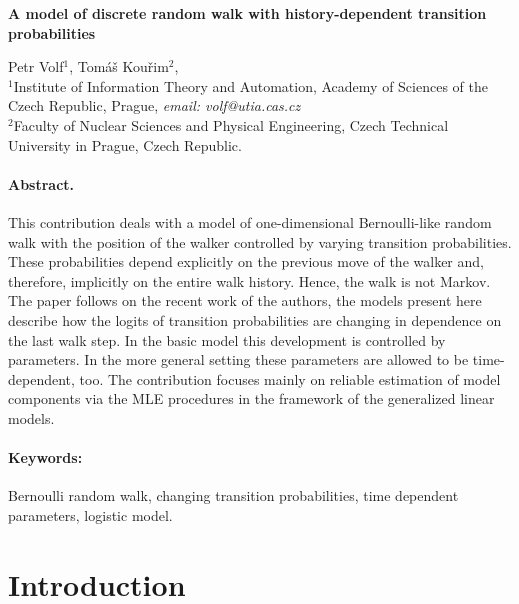 \documentclass[11pt]{article}
\begin{document}
\begin{center}
  {\Large \bf A model of discrete random walk with
  history-dependent transition probabilities}

\medskip
    Petr Volf$^1$, Tom\'{a}\v{s} Kou\v{r}im$^2$,
 \smallskip\\
   {\small $^1$Institute of Information Theory and Automation, Academy of Sciences of the
  Czech Republic, Prague, {\em email: volf@utia.cas.cz}\\  
  $^2$Faculty of Nuclear Sciences and Physical Engineering,
  Czech Technical University in Prague, Czech Republic.}

\end{center}

\paragraph{Abstract.} This contribution deals with a model of
one-dimensional Bernoulli-like random
walk with the position of the walker controlled by varying transition
probabilities. These probabilities depend explicitly on the previous move
of the walker and, therefore, implicitly on the entire walk history. Hence, the walk is not Markov.
The paper follows on the recent work of the authors, the models present
here describe how the logits of transition probabilities are changing
in dependence on the last walk step. In the basic
model this development is controlled by parameters. In the more general setting
these parameters are allowed to be time-dependent, too.
The contribution focuses mainly on reliable estimation of model components
via the MLE procedures in the framework of the generalized linear models.

\paragraph{Keywords:} Bernoulli random walk, changing transition probabilities,
time dependent parameters, logistic model.

\section{Introduction}
\end{document}
